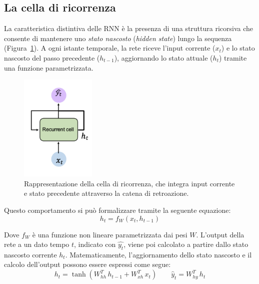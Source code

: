 \subsection{La cella di ricorrenza}
La caratteristica distintiva delle RNN è la presenza di una struttura ricorsiva che consente di mantenere uno \textit{stato nascosto} (\textit{hidden state}) lungo la sequenza (Figura~\ref{fig:recurrency_cell}). A ogni istante temporale, la rete riceve l'input corrente ($x_t$) e lo stato nascosto del passo precedente ($h_{t-1}$), aggiornando lo stato attuale ($h_t$) tramite una funzione parametrizzata.
\begin{figure}
    \centering
    \includegraphics[width=0.32\textwidth]{figure/Recurrency_RNN.png}
    \caption{Rappresentazione della cella di ricorrenza, che integra input corrente e stato precedente attraverso la catena di retroazione.}
    \label{fig:recurrency_cell}
\end{figure}
Questo comportamento si può formalizzare tramite la seguente equazione:
\begin{equation}
    h_t = f_W(x_t, h_{t-1})
\end{equation}

Dove $f_W$ è una funzione non lineare parametrizzata dai pesi $W$. L'output della rete a un dato tempo $t$, indicato con $\hat{y_t}$, viene poi calcolato a partire dallo stato nascosto corrente $h_t$. Matematicamente, l'aggiornamento dello stato nascosto e il calcolo dell'output possono essere espressi come segue:
\begin{equation}
    h_t = \tanh(W_{hh}^T\,h_{t-1} + W_{xh}^T\,x_t) \qquad \hat{y}_t = W_{hy}^T\,h_t
\end{equation}

